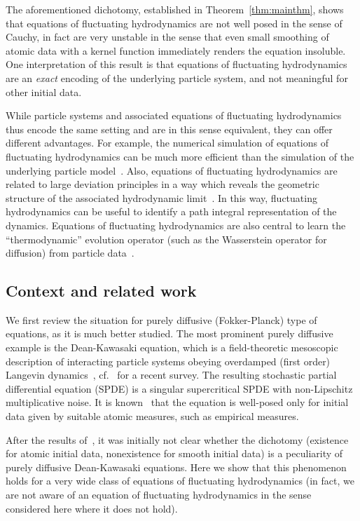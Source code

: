 \documentclass{article}
\begin{document}
The aforementioned dichotomy, established in Theorem~\ref{thm:mainthm}, shows that equations of fluctuating
hydrodynamics are not well posed in the sense of Cauchy, in fact are very unstable in the sense that even
small smoothing of atomic data with a kernel function immediately renders the equation insoluble. One
interpretation of this result is that equations of fluctuating hydrodynamics are an \emph{exact} encoding of
the underlying particle system, and not meaningful for other initial data.

While particle systems and associated equations of fluctuating hydrodynamics thus encode the same setting and
are in this sense equivalent, they can offer different advantages. For example, the numerical simulation of
equations of fluctuating hydrodynamics can be much more efficient than the simulation of the underlying
particle model~\cite{Helfmann2021a,Cornalba2023a,Cornalba2023bTR}.  Also, equations of fluctuating
hydrodynamics are related to large deviation principles in a way which reveals the geometric structure of the
associated hydrodynamic limit~\cite[Section 3.5]{Jack2014a}. In this way, fluctuating hydrodynamics can be
useful to identify a path integral representation of the dynamics. Equations of fluctuating hydrodynamics are
also central to learn the ``thermodynamic'' evolution operator (such as the Wasserstein operator for
diffusion) from particle data~\cite{Li2019a}.


\subsection{Context and related work}

We first review the situation for purely diffusive (Fokker-Planck) type of equations, as it is much better
studied. The most prominent purely diffusive example is the Dean-Kawasaki equation, which is a field-theoretic
mesoscopic description of interacting particle systems obeying overdamped (first order) Langevin
dynamics~\cite{Dean1996a,Kawasaki1973a}, cf.~\cite{illien2025} for a recent survey. The resulting stochastic
partial differential equation (SPDE) is a singular supercritical SPDE with non-Lipschitz multiplicative
noise. It is known~\cite{Konarovskyi2019a,Konarovskyi2020a} that the equation is well-posed only for initial
data given by suitable atomic measures, such as empirical measures.

After the results of~\cite{Konarovskyi2019a,Konarovskyi2020a}, it was initially not clear whether the
dichotomy (existence for atomic initial data, nonexistence for smooth initial data) is a peculiarity of purely
diffusive Dean-Kawasaki equations. Here we show that this phenomenon holds for a very wide class of equations
of fluctuating hydrodynamics (in fact, we are not aware of an equation of fluctuating hydrodynamics in the
sense considered here where it does not hold).
\end{document}
